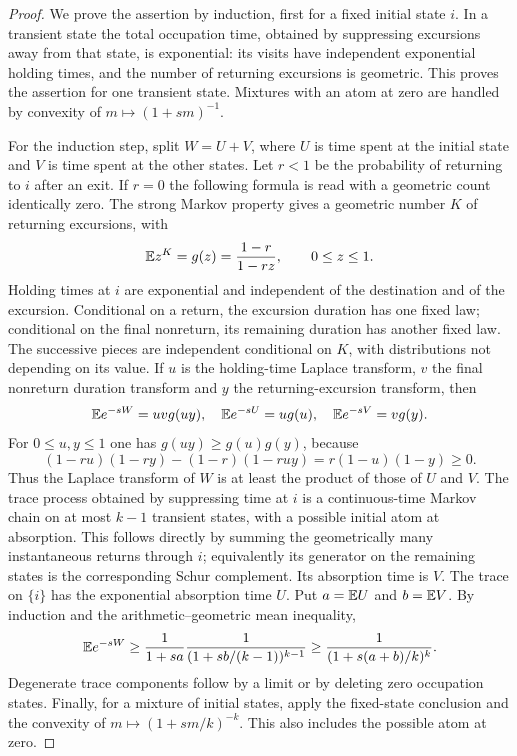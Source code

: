 \begin{proof}
We prove the assertion by induction, first for a fixed initial state $i$. In a transient state the total occupation time, obtained by suppressing excursions away from that state, is exponential: its visits have independent exponential holding times, and the number of returning excursions is geometric. This proves the assertion for one transient state. Mixtures with an atom at zero are handled by convexity of $m\mapsto(1+sm)^{-1}$.

For the induction step, split $W=U+V$, where $U$ is time spent at the initial state and $V$ is time spent at the other states. Let $r<1$ be the probability of returning to $i$ after an exit. If $r=0$ the following formula is read with a geometric count identically zero. The strong Markov property gives a geometric number $K$ of returning excursions, with
\[
 \mathbb E z^K=g(z)=\frac{1-r}{1-rz},\qquad 0\le z\le1.
\]
Holding times at $i$ are exponential and independent of the destination and of the excursion. Conditional on a return, the excursion duration has one fixed law; conditional on the final nonreturn, its remaining duration has another fixed law. The successive pieces are independent conditional on $K$, with distributions not depending on its value. If $u$ is the holding-time Laplace transform, $v$ the final nonreturn duration transform and $y$ the returning-excursion transform, then
\[
 \mathbb E e^{-sW}=uvg(uy),\quad
 \mathbb E e^{-sU}=u g(u),\quad
 \mathbb E e^{-sV}=v g(y).
\]
For $0\le u,y\le1$ one has $g(uy)\ge g(u)g(y)$, because
\[
 (1-ru)(1-ry)-(1-r)(1-ruy)=r(1-u)(1-y)\ge0.
\]
Thus the Laplace transform of $W$ is at least the product of those of $U$ and $V$. The trace process obtained by suppressing time at $i$ is a continuous-time Markov chain on at most $k-1$ transient states, with a possible initial atom at absorption. This follows directly by summing the geometrically many instantaneous returns through $i$; equivalently its generator on the remaining states is the corresponding Schur complement. Its absorption time is $V$. The trace on $\{i\}$ has the exponential absorption time $U$. Put $a=\mathbb E U$ and $b=\mathbb E V$. By induction and the arithmetic--geometric mean inequality,
\[
 \mathbb E e^{-sW}\ge\frac1{1+sa}\frac1{(1+sb/(k-1))^{k-1}}
       \ge\frac1{(1+s(a+b)/k)^k}.
\]
Degenerate trace components follow by a limit or by deleting zero occupation states. Finally, for a mixture of initial states, apply the fixed-state conclusion and the convexity of $m\mapsto(1+sm/k)^{-k}$. This also includes the possible atom at zero.
\end{proof}

